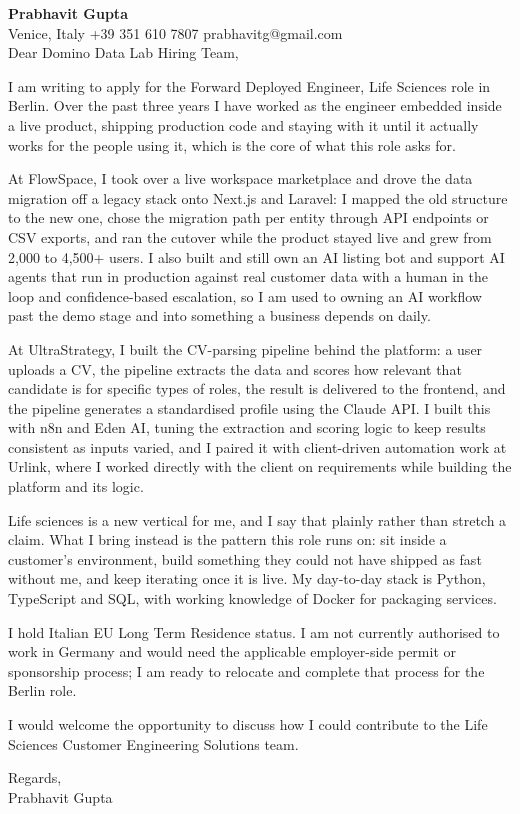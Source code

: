 \documentclass[a4paper,10.5pt]{article}
\begin{document}
\textbf{Prabhavit Gupta}\\
Venice, Italy \textbar{} +39 351 610 7807 \textbar{} prabhavitg@gmail.com\\[10pt]
Dear Domino Data Lab Hiring Team,

I am writing to apply for the Forward Deployed Engineer, Life Sciences role in Berlin. Over the past three years I have worked as the engineer embedded inside a live product, shipping production code and staying with it until it actually works for the people using it, which is the core of what this role asks for.

At FlowSpace, I took over a live workspace marketplace and drove the data migration off a legacy stack onto Next.js and Laravel: I mapped the old structure to the new one, chose the migration path per entity through API endpoints or CSV exports, and ran the cutover while the product stayed live and grew from 2,000 to 4,500+ users. I also built and still own an AI listing bot and support AI agents that run in production against real customer data with a human in the loop and confidence-based escalation, so I am used to owning an AI workflow past the demo stage and into something a business depends on daily.

At UltraStrategy, I built the CV-parsing pipeline behind the platform: a user uploads a CV, the pipeline extracts the data and scores how relevant that candidate is for specific types of roles, the result is delivered to the frontend, and the pipeline generates a standardised profile using the Claude API. I built this with n8n and Eden AI, tuning the extraction and scoring logic to keep results consistent as inputs varied, and I paired it with client-driven automation work at Urlink, where I worked directly with the client on requirements while building the platform and its logic.

Life sciences is a new vertical for me, and I say that plainly rather than stretch a claim. What I bring instead is the pattern this role runs on: sit inside a customer's environment, build something they could not have shipped as fast without me, and keep iterating once it is live. My day-to-day stack is Python, TypeScript and SQL, with working knowledge of Docker for packaging services.

I hold Italian EU Long Term Residence status. I am not currently authorised to work in Germany and would need the applicable employer-side permit or sponsorship process; I am ready to relocate and complete that process for the Berlin role.

I would welcome the opportunity to discuss how I could contribute to the Life Sciences Customer Engineering Solutions team.

Regards,\\
Prabhavit Gupta
\end{document}
